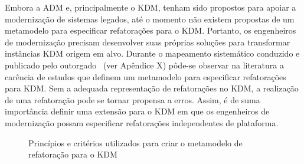 Embora a ADM e, principalmente o KDM, tenham sido propostos para apoiar a modernização de sistemas legados, até o momento não existem propostas de um metamodelo para especificar refatorações para o KDM. Portanto, os engenheiros de modernização precisam desenvolver suas próprias soluções para transformar instâncias KDM origem em alvo. Durante o mapeamento sistemático conduzido e publicado pelo outorgado~\citep{iri_systematic_mapping_ADM_2014} (ver Apêndice X) pôde-se observar na literatura a carência de estudos que definem um metamodelo para especificar refatorações para KDM. Sem a adequada representação de refatorações no KDM, a realização de uma refatoração pode se tornar propensa a erros. Assim, é de suma importância definir uma extensão para o KDM em que os engenheiros de modernização possam especificar refatorações independentes de plataforma.

\begin{figure}[!h]
 \centering
\caption{Princípios e critérios utilizados para criar o metamodelo de refatoração para o KDM}
 \label{fig:processoDOMETAMODELO}
\end{figure}

